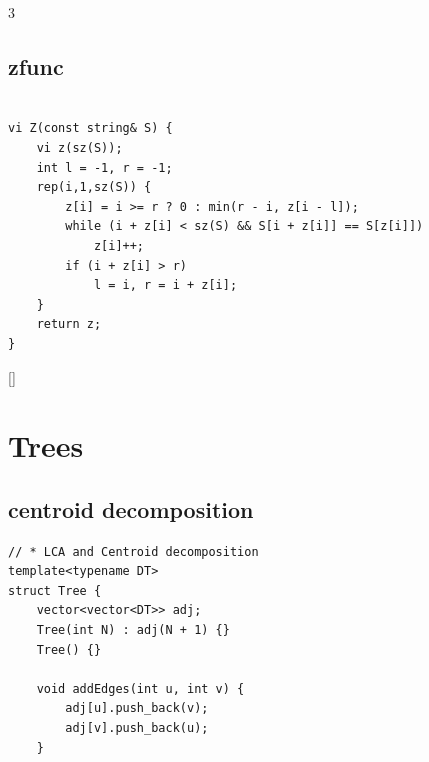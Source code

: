 \documentclass[twoside]{article}
\begin{document}
\begin{multicols*}{3}
{
\subsection*{zfunc}
}
\begin{verbatim}

vi Z(const string& S) {
    vi z(sz(S));
    int l = -1, r = -1;
    rep(i,1,sz(S)) {
        z[i] = i >= r ? 0 : min(r - i, z[i - l]);
        while (i + z[i] < sz(S) && S[i + z[i]] == S[z[i]])
            z[i]++;
        if (i + z[i] > r)
            l = i, r = i + z[i];
    }
    return z;
}

\end{verbatim}

{
[\vspace{2em}]
\section*{Trees}
}
{
\subsection*{centroid decomposition}
}
\begin{verbatim}
// * LCA and Centroid decomposition
template<typename DT>
struct Tree {
    vector<vector<DT>> adj;
    Tree(int N) : adj(N + 1) {}
    Tree() {}

    void addEdges(int u, int v) {
        adj[u].push_back(v);
        adj[v].push_back(u);
    }


\end{verbatim}
\end{multicols*}
\end{document}
